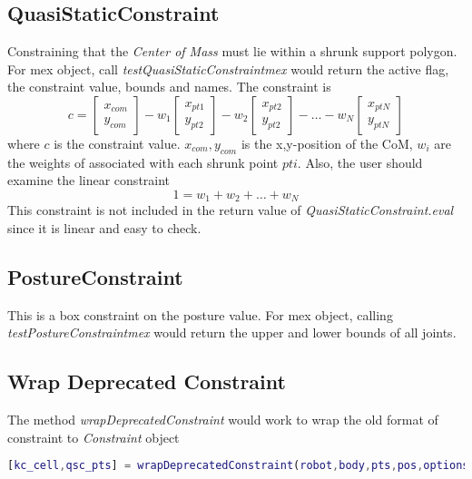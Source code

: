 \documentclass{article}
\begin{document}
\subsection{QuasiStaticConstraint}
Constraining that the \textit{Center of Mass} must lie within a shrunk support polygon. For mex object, call \textsl{testQuasiStaticConstraintmex} would return the active flag, the constraint value, bounds and names. The constraint is
\begin{equation}
c = \begin{bmatrix}x_{com}\\y_{com}\end{bmatrix}-w_1\begin{bmatrix}x_{pt1}\\y_{pt2}\end{bmatrix}-w_2\begin{bmatrix}x_{pt2}\\y_{pt2}\end{bmatrix}-\hdots-w_N\begin{bmatrix}x_{ptN}\\y_{ptN}\end{bmatrix}
\end{equation}
where $c$ is the constraint value. $x_{com},y_{com}$ is the x,y-position of the CoM, $w_i$ are the weights of associated with each shrunk point $pti$. Also, the user should examine the linear constraint
\begin{equation}
1 = w_1+w_2+\hdots+w_N
\end{equation}
This constraint is not included in the return value of \textsl{QuasiStaticConstraint.eval} since it is linear and easy to check.

\subsection{PostureConstraint}
This is a box constraint on the posture value. For mex object, calling \textsl{testPostureConstraintmex} would return the upper and lower bounds of all joints.
\subsection{Wrap Deprecated Constraint}
The method \textsl{wrapDeprecatedConstraint} would work to wrap the old format of constraint to \textsl{Constraint} object
\begin{lstlisting}[language=MATLAB]
[kc_cell,qsc_pts] = wrapDeprecatedConstraint(robot,body,pts,pos,options)
\end{lstlisting}
\end{document}
